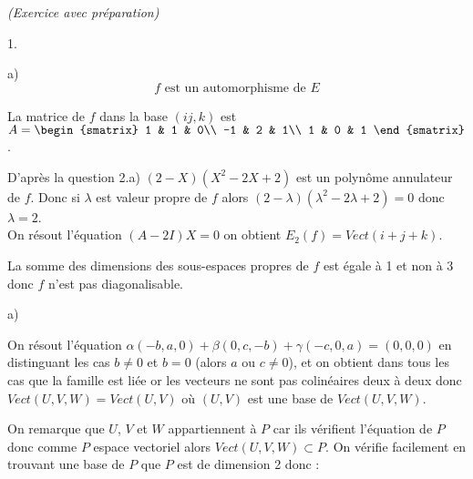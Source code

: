 \documentclass[11pt]{article}%
\begin{document}
\begin{exercice}{\it (Exercice avec préparation)}
\begin{noliste}{1.}
\begin{noliste}{a)}
\[
 \text{$f$ est un automorphisme de $E$}
\]
 \item La matrice de $f$ dans la base $(ij,k)$ est $A = \begin{smatrix}
1 & 1 & 0\\
-1 & 2 & 1\\
1 & 0 & 1
\end{smatrix}
$. 
 \item D'après la question 2.a) $(2-X)(X^{2}-2X + 2)$ est un polynôme
annulateur de $f$. Donc si $\lambda$ est valeur propre de $f$ alors
$(2-\lambda)(\lambda^{2}-2\lambda + 2) = 0$ donc $\lambda = 2$.\\
 On résout l'équation $(A-2I)X = 0$ on obtient $E_{2}(f) = Vect(i + j +
k)$. 
 \end{noliste}
 \item La somme des dimensions des sous-espaces propres de $f$ est
égale à 1 et non à 3 donc $f$ n'est pas diagonalisable.
 \begin{noliste}{a)}
 \setlength{\itemsep}{2mm}
 \item On résout l'équation $\alpha(-b,a,0) + \beta (0,c,-b) + \gamma
(-c,0,a) = (0,0,0)$ en distinguant les cas $b\neq 0$ et $b = 0$ (alors
$a$ ou $c \neq 0$), et on obtient dans tous les cas que la famille est
liée or les vecteurs ne sont pas colinéaires deux à deux donc
$Vect(U,V,W) = Vect(U,V)$ où $(U,V)$ est une base de $Vect(U,V,W)$. 
 \item On remarque que $U$, $V$ et $W$ appartiennent à $P$ car ils
vérifient l'équation de $P$ donc comme $P$ espace vectoriel alors
$Vect(U,V,W) \subset P$. On vérifie facilement en trouvant une base de
$P$ que $P$ est de dimension 2 donc : 
 

\end{noliste}
\end{noliste}
\end{exercice}
\end{document}
